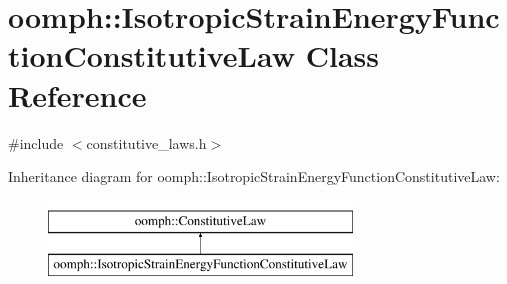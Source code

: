 \hypertarget{classoomph_1_1IsotropicStrainEnergyFunctionConstitutiveLaw}{}\section{oomph\+:\+:Isotropic\+Strain\+Energy\+Function\+Constitutive\+Law Class Reference}
\label{classoomph_1_1IsotropicStrainEnergyFunctionConstitutiveLaw}


{\ttfamily \#include $<$constitutive\+\_\+laws.\+h$>$}

Inheritance diagram for oomph\+:\+:Isotropic\+Strain\+Energy\+Function\+Constitutive\+Law\+:\begin{figure}[H]
\begin{center}
\leavevmode
\includegraphics[height=2.000000cm]{classoomph_1_1IsotropicStrainEnergyFunctionConstitutiveLaw}
\end{center}
\end{figure}

